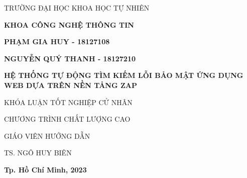 \newpage
\begin{center}
        
    \large TRƯỜNG ĐẠI HỌC KHOA HỌC TỰ NHIÊN 
    
    \textbf{\large KHOA CÔNG NGHỆ THÔNG TIN }
    
    \vspace{2cm}
    
    \textbf{\large PHẠM GIA HUY - 18127108}
    
    \textbf{\large NGUYỄN QUÝ THANH - 18127210}
    
    \vspace{2cm}
    
    \textbf{\LARGE HỆ THỐNG TỰ ĐỘNG TÌM KIẾM LỖI BẢO MẬT ỨNG DỤNG WEB DỰA TRÊN NỀN TẢNG ZAP }
    
    \vspace{2cm}
    
    \large KHÓA LUẬN TỐT NGHIỆP CỬ NHÂN

    \large CHƯƠNG TRÌNH CHẤT LƯỢNG CAO
    
    \vspace{2cm}
    
    \large GIÁO VIÊN HƯỚNG DẪN
    
    \large TS. NGÔ HUY BIÊN
    
    \vspace{3.5cm}
    
    \textbf{\large Tp. Hồ Chí Minh, 2023 }    
\end{center}


    

    